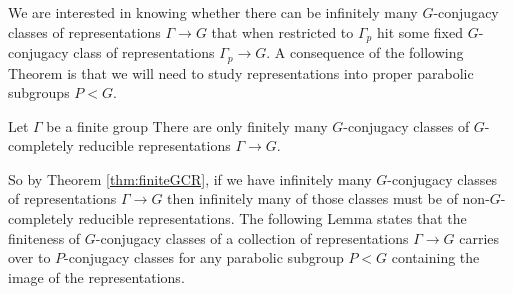 We are interested in knowing whether there can be infinitely many $G$-conjugacy classes of representations $\Gamma\rightarrow G$ that when restricted to $\Gamma_p$ hit some fixed $G$-conjugacy class of representations $\Gamma_p\rightarrow G$. A consequence of the following Theorem \cite[Theorem 1.2]{martin2003reductive} is that we will need to study representations into proper parabolic subgroups $P < G$.

\begin{theorem} \label{thm:finiteGCR} Let $\Gamma$ be a finite group There are only finitely many $G$-conjugacy classes of $G$-completely reducible representations $\Gamma\rightarrow G$.
\end{theorem}

So by Theorem \ref{thm:finiteGCR}, if we have infinitely many $G$-conjugacy classes of representations $\Gamma\rightarrow G$ then infinitely many of those classes must be of non-$G$-completely reducible representations. The following Lemma states that the finiteness of $G$-conjugacy classes of a collection of representations $\Gamma\rightarrow G$ carries over to $P$-conjugacy classes for any parabolic subgroup $P<G$ containing the image of the representations.


